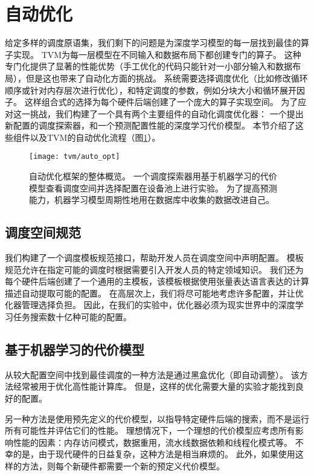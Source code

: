 \section{自动优化}
\label{automating}
给定多样的调度原语集，我们剩下的问题是为深度学习模型的每一层找到最佳的算子实现。
TVM为每一层模型在不同输入和数据布局下都创建专门的算子。
这种专门化提供了显著的性能优势（手工优化的代码只能针对一小部分输入和数据布局），但是这也带来了自动化方面的挑战。
系统需要选择调度优化（比如修改循环顺序或针对内存层次进行优化），和特定调度的参数，例如分块大小和循环展开因子。
这样组合式的选择为每个硬件后端创建了一个庞大的算子实现空间。
为了应对这一挑战，我们构建了一个具有两个主要组件的自动化调度优化器：
一个提出新配置的调度探索器，和一个预测配置性能的深度学习代价模型。
本节介绍了这些组件以及TVM的自动优化流程（图\ref{fig:auto opt}）。

\begin{figure}[htbp]
    \centering
    \texttt{[image: tvm/auto\_opt]}
    \caption{\label{fig:auto opt}自动优化框架的整体概览。
    一个调度探索器用基于机器学习的代价模型查看调度空间并选择配置在设备池上进行实验。
    为了提高预测能力，机器学习模型周期性地用在数据库中收集的数据改进自己。}
\end{figure}

\subsection{调度空间规范}
我们构建了一个调度模板规范接口，帮助开发人员在调度空间中声明配置。 
模板规范允许在指定可能的调度时根据需要引入开发人员的特定领域知识。
我们还为每个硬件后端创建了一个通用的主模板，该模板根据使用张量表达语言表达的计算描述自动提取可能的配置。
在高层次上，我们将尽可能地考虑许多配置，并让优化器管理选择负担。
因此，在我们的实验中，优化器必须为现实世界中的深度学习任务搜索数十亿种可能的配置。

\subsection{基于机器学习的代价模型}
从较大配置空间中找到最佳调度的一种方法是通过黑盒优化（即自动调整）。
该方法经常被用于优化高性能计算库。
但是，这样的优化需要大量的实验才能找到良好的配置。

另一种方法是使用预先定义的代价模型，以指导特定硬件后端的搜索，而不是运行所有可能性并评估它们的性能。
理想情况下，一个理想的代价模型应考虑所有影响性能的因素：内存访问模式，数据重用，流水线数据依赖和线程化模式等。
不幸的是，由于现代硬件的日益复杂，这种方法是相当麻烦的。
此外，如果使用这样的方法，则每个新硬件都需要一个新的预定义代价模型。


